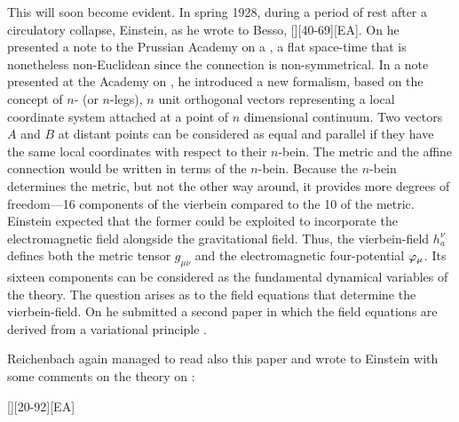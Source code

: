 \documentclass[draft]{article}
\newcommand{\nbein}{$n$-bein\xspace}
\newcommand{\vbein}{vierbein\xspace}
\newcommand{\hbein}{\ensuremath{h_{a}^{\nu}}\xspace}
\begin{document}
This will soon become evident. In spring 1928, during a period of rest after a circulatory collapse, Einstein, as he wrote to Besso, [][40-69][EA]. On  he presented a note to the Prussian Academy on a  \citep{Einstein19281}, a flat space-time that is nonetheless non-Euclidean since the connection is non-symmetrical. In a note presented at the Academy on  \citep{Einstein19281}, he introduced a new formalism, based on the concept of $n$- (or $n$-legs), $n$ unit orthogonal vectors representing a local coordinate system attached at a point of $n$ dimensional continuum. Two vectors $A$ and $B$ at distant points can be considered as equal and parallel if they have the same local coordinates with respect to their \nbein. The metric and the affine connection would be written in terms of the \nbein. Because the \nbein determines the metric, but not the other way around, it provides more degrees of freedom---16 components of the \vbein compared to the 10 of the metric. Einstein expected that the former could be exploited to incorporate the electromagnetic field alongside the gravitational field. Thus, the \vbein-field \hbein defines both the metric tensor $g_{\mu \nu}$ and the electromagnetic four-potential $\varphi_{\mu}$. Its sixteen components can be considered as the fundamental dynamical variables of the theory. The question arises as to the field equations that determine the \vbein-field. On  he submitted a second paper in which the field equations are derived from a variational principle \citep{Einstein19282}.

Reichenbach again managed to read also this paper and wrote to Einstein with some comments on the theory on :
 
[][20-92\me][EA]
\end{document}
